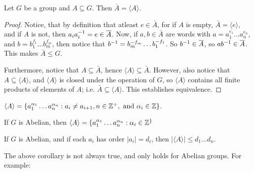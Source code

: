 \begin{lemma}\label{lemma_2.4.3}
  Let $G$ be a group and  $A \subseteq G$. Then  $\bar{A}=\langle A \rangle$.
\end{lemma}
\begin{proof}
  Notice, that by definition that atleast $e \in \bar{A}$, for if $A$ is empty,
  $\bar{A}=\langle e \rangle$, and if $A$ is not, then  $a_ia_i^{-1}=e \in
  \overline{A}$. Now, if $a,b \in \bar{A}$ are words with $a=a_1^{e_1} \dots
  a_n^{e_n}$, and $b=b_1^{f_1} \dots b_m^{f_m}$, then notice that
  $b^{-1}=b_m^{-f_m} \dots b_1^{-f_1}$. So $b^{-1} \in \overline{A}$, so
  $ab^{-1} \in \overline{A}$. This makes $\bar{A} \leq G$.

  Furthermore, notice that $A \subseteq \bar{A}$, hence $\langle A \rangle
  \subseteq \bar{A}$. However, also notice that $A \subseteq \langle A
  \rangle$, and $\langle A \rangle$ is closed under the operation of $G$, so
  $\langle A \rangle$ contains all finite products of elements of $A$; i.e.
  $\bar{A} \subseteq \langle A \rangle$.
  This establishes equivalence.
\end{proof}
\begin{corollary}
  $\langle A \rangle=\{a_1^{\alpha_1} \dots a_n^{\alpha_n} : a_i \neq a_{i+1},
    n \in \mathbb{Z}^+, \text{ and } \alpha_i \in \mathbb{Z}\}$.
\end{corollary}
\begin{corollary}
  If $G$ is Abelian, then  $\langle A \rangle=\{a_1^{\alpha_1} \dots a_n^{\alpha_n} :
  \alpha_i \in \mathbb{Z}^\}$
\end{corollary}
\begin{corollary}
  If $G$ is Abelian, and if each $a_i$ has order $|a_i|=d_i$, then
  $|\langle A \rangle| \leq d_1 \dots d_n$.
\end{corollary}

The above corollary is not always true, and only holds for Abelian groups. For
example:

